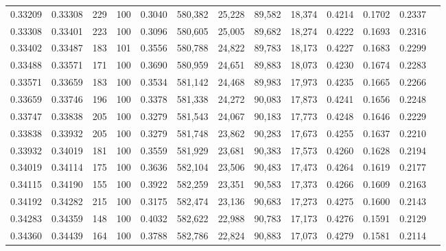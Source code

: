 \begin{tabular}{rrrrrrrrrrrrr}
0.33209 & 0.33308 &   229 & 100 &                                     0.3040 & 580,382 &  25,228 &  89,582 &  18,374 & 0.4214 & 0.1702 & 0.2337 \\
0.33308 & 0.33401 &   223 & 100 &                                     0.3096 & 580,605 &  25,005 &  89,682 &  18,274 & 0.4222 & 0.1693 & 0.2316 \\
0.33402 & 0.33487 &   183 & 101 &                                     0.3556 & 580,788 &  24,822 &  89,783 &  18,173 & 0.4227 & 0.1683 & 0.2299 \\
0.33488 & 0.33571 &   171 & 100 &                                     0.3690 & 580,959 &  24,651 &  89,883 &  18,073 & 0.4230 & 0.1674 & 0.2283 \\
0.33571 & 0.33659 &   183 & 100 &                                     0.3534 & 581,142 &  24,468 &  89,983 &  17,973 & 0.4235 & 0.1665 & 0.2266 \\
0.33659 & 0.33746 &   196 & 100 &                                     0.3378 & 581,338 &  24,272 &  90,083 &  17,873 & 0.4241 & 0.1656 & 0.2248 \\
0.33747 & 0.33838 &   205 & 100 &                                     0.3279 & 581,543 &  24,067 &  90,183 &  17,773 & 0.4248 & 0.1646 & 0.2229 \\
0.33838 & 0.33932 &   205 & 100 &                                     0.3279 & 581,748 &  23,862 &  90,283 &  17,673 & 0.4255 & 0.1637 & 0.2210 \\
0.33932 & 0.34019 &   181 & 100 &                                     0.3559 & 581,929 &  23,681 &  90,383 &  17,573 & 0.4260 & 0.1628 & 0.2194 \\
0.34019 & 0.34114 &   175 & 100 &                                     0.3636 & 582,104 &  23,506 &  90,483 &  17,473 & 0.4264 & 0.1619 & 0.2177 \\
0.34115 & 0.34190 &   155 & 100 &                                     0.3922 & 582,259 &  23,351 &  90,583 &  17,373 & 0.4266 & 0.1609 & 0.2163 \\
0.34192 & 0.34282 &   215 & 100 &                                     0.3175 & 582,474 &  23,136 &  90,683 &  17,273 & 0.4275 & 0.1600 & 0.2143 \\
0.34283 & 0.34359 &   148 & 100 &                                     0.4032 & 582,622 &  22,988 &  90,783 &  17,173 & 0.4276 & 0.1591 & 0.2129 \\
0.34360 & 0.34439 &   164 & 100 &                                     0.3788 & 582,786 &  22,824 &  90,883 &  17,073 & 0.4279 & 0.1581 & 0.2114 \\

\end{tabular}
